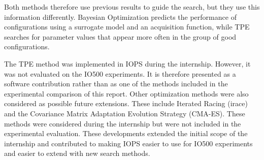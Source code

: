 Both methods therefore use previous results to guide the search, but they
use this information differently. Bayesian Optimization predicts the
performance of configurations using a surrogate model and an acquisition
function, while TPE searches for parameter values that appear more often
in the group of good configurations.

The TPE method was implemented in IOPS during the internship. However, it
was not evaluated on the IO500 experiments. It is therefore presented as
a software contribution rather than as one of the methods included in the
experimental comparison of this report.
Other optimization methods were also considered as possible future
extensions. These include Iterated Racing (irace) and the Covariance
Matrix Adaptation Evolution Strategy (CMA-ES). These methods were
considered during the internship but were not included in the experimental
evaluation.
These developments extended the initial scope of the internship and
contributed to making IOPS easier to use for IO500 experiments and easier
to extend with new search methods.


